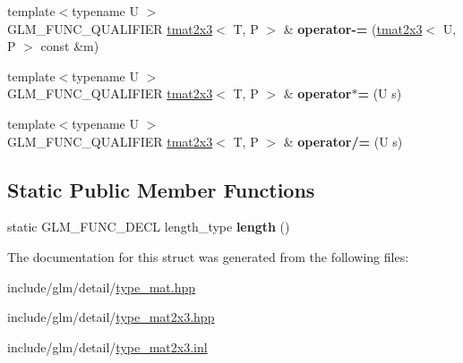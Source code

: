 \begin{DoxyCompactItemize}
{\footnotesize template$<$typename U $>$ }\\G\+L\+M\+\_\+\+F\+U\+N\+C\+\_\+\+Q\+U\+A\+L\+I\+F\+I\+ER \hyperlink{structglm_1_1tmat2x3}{tmat2x3}$<$ T, P $>$ \& {\bfseries operator-\/=} (\hyperlink{structglm_1_1tmat2x3}{tmat2x3}$<$ U, P $>$ const \&m)
\item 
\mbox{\label{structglm_1_1tmat2x3_a3301a48c44c671556109b4cbf37daf81}} 
{\footnotesize template$<$typename U $>$ }\\G\+L\+M\+\_\+\+F\+U\+N\+C\+\_\+\+Q\+U\+A\+L\+I\+F\+I\+ER \hyperlink{structglm_1_1tmat2x3}{tmat2x3}$<$ T, P $>$ \& {\bfseries operator$\ast$=} (U s)
\item 
\mbox{\label{structglm_1_1tmat2x3_aeb03b749f9cc0705bac20e5c76c7d9d0}} 
{\footnotesize template$<$typename U $>$ }\\G\+L\+M\+\_\+\+F\+U\+N\+C\+\_\+\+Q\+U\+A\+L\+I\+F\+I\+ER \hyperlink{structglm_1_1tmat2x3}{tmat2x3}$<$ T, P $>$ \& {\bfseries operator/=} (U s)
\end{DoxyCompactItemize}
\subsection*{Static Public Member Functions}
\begin{DoxyCompactItemize}
\item 
\mbox{\label{structglm_1_1tmat2x3_abc8782efbb06155a31d9d2efd77adbd4}} 
static G\+L\+M\+\_\+\+F\+U\+N\+C\+\_\+\+D\+E\+CL length\+\_\+type {\bfseries length} ()
\end{DoxyCompactItemize}


The documentation for this struct was generated from the following files\+:\begin{DoxyCompactItemize}
\item 
include/glm/detail/\hyperlink{type__mat_8hpp}{type\+\_\+mat.\+hpp}\item 
include/glm/detail/\hyperlink{type__mat2x3_8hpp}{type\+\_\+mat2x3.\+hpp}\item 
include/glm/detail/\hyperlink{type__mat2x3_8inl}{type\+\_\+mat2x3.\+inl}\end{DoxyCompactItemize}
